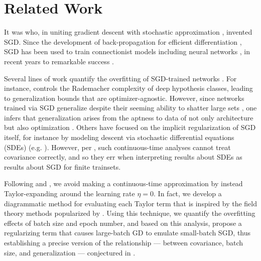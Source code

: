 \documentclass{article}
\begin{document}

\section{Related Work}


    It was \citet{ki52} who, in uniting gradient descent \citep{ca47} with
    stochastic approximation \citep{ro51}, invented SGD.  Since the development
    of back-propagation for efficient differentiation \citep{we74}, SGD
    has been used to train connectionist models including neural
    networks \citep{bo91}, in recent years to remarkable success \citep{le15}.


    Several lines of work quantify the overfitting of SGD-trained networks
    \citep{ne17a}.  For instance, \citet{ba17} controls the Rademacher
    complexity of deep hypothesis classes, leading to generalization bounds
    that are optimizer-agnostic.  However, since networks trained via SGD
    generalize despite their seeming ability to shatter large sets
    \citep{zh17}, one infers that generalization arises from the aptness to
    data of not only architecture but also optimization \citep{ne17b}.  Others
    have focused on the implicit regularization of SGD itself, for instance by
    modeling descent via stochastic differential equations (SDEs) (e.g.
    \citet{ch18}).  However, per \citet{ya19}, such continuous-time analyses
    cannot treat covariance correctly, and so they err when interpreting
    results about SDEs as results about SGD for finite trainsets.


    Following \citet{li17} and \citet{ro18}, we avoid making a continuous-time
    approximation by instead Taylor-expanding around the learning rate
    $\eta=0$.  In fact, we develop a diagrammatic method for evaluating each
    Taylor term that is inspired by the field theory methods popularized by
    \citet{dy49a}.  Using this technique, we quantify the overfitting effects
    of batch size and epoch number, and based on this analysis, propose a
    regularizing term that causes large-batch GD to emulate small-batch SGD,
    thus establishing a precise version of the relationship --- between
    covariance, batch size, and generalization --- conjectured in
    \citet{ja18}.  
    
\end{document}
